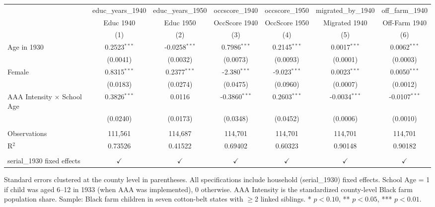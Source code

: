 
\begingroup
\centering
\begin{tabular}{lcccccc}
   \toprule
                                      & educ\_years\_1940   & educ\_years\_1950   & occscore\_1940  & occscore\_1950  & migrated\_by\_1940   & off\_farm\_1940\\    
                                      & Educ 1940           & Educ 1950           & OccScore 1940   & OccScore 1950   & Migrated 1940        & Off-Farm 1940 \\   
                                      & (1)                 & (2)                 & (3)             & (4)             & (5)                  & (6)\\  
   \midrule 
   Age in 1930                        & 0.2523$^{***}$      & -0.0258$^{***}$     & 0.7986$^{***}$  & 0.2145$^{***}$  & 0.0017$^{***}$       & 0.0062$^{***}$\\   
                                      & (0.0041)            & (0.0032)            & (0.0073)        & (0.0093)        & (0.0001)             & (0.0003)\\   
   Female                             & 0.8315$^{***}$      & 0.2377$^{***}$      & -2.380$^{***}$  & -9.023$^{***}$  & 0.0023$^{***}$       & 0.0050$^{***}$\\   
                                      & (0.0183)            & (0.0274)            & (0.0475)        & (0.0960)        & (0.0007)             & (0.0012)\\   
   AAA Intensity $\times$ School Age  & 0.3826$^{***}$      & 0.0116              & -0.3860$^{***}$ & 0.2603$^{***}$  & -0.0034$^{***}$      & -0.0107$^{***}$\\   
                                      & (0.0240)            & (0.0173)            & (0.0348)        & (0.0452)        & (0.0006)             & (0.0010)\\   
    \\
   Observations                       & 111,561             & 114,687             & 114,701         & 114,701         & 114,701              & 114,701\\  
   R$^2$                              & 0.73526             & 0.41522             & 0.69402         & 0.60323         & 0.90148              & 0.90182\\  
    \\
   serial\_1930 fixed effects         & $\checkmark$        & $\checkmark$        & $\checkmark$    & $\checkmark$    & $\checkmark$         & $\checkmark$\\   
   \bottomrule
\end{tabular}
 
\par \raggedright 
Standard errors clustered at the county level in parentheses. All specifications include household (serial\_1930) fixed effects. School Age = 1 if child was aged 6--12 in 1933 (when AAA was implemented), 0 otherwise. AAA Intensity is the standardized county-level Black farm population share. Sample: Black farm children in seven cotton-belt states with $\geq$2 linked siblings. * $p<0.10$, ** $p<0.05$, *** $p<0.01$.
\par\endgroup


